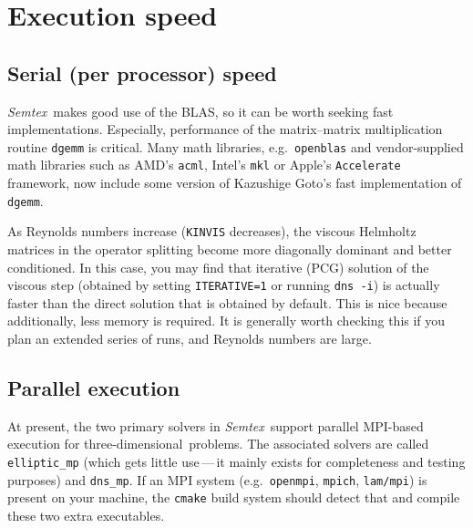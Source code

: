 \documentclass[11pt]{report}
\newcommand{\Semtex}{\emph{Semtex}} \newcommand{\Dog}{\emph{Dog}}
\newcommand\threed{three-di\-men\-sion\-al}
\newcommand{\eg}{e.g.\ } \newcommand{\CC}{\mathrm{c.c.}}
\begin{document}
\section{Execution speed}
\label{sec.speed}

\subsection{Serial (per processor) speed}

\Semtex\ makes good use of the BLAS, so it can be worth seeking fast
implementations. Especially, performance of the matrix--matrix
multiplication routine \verb+dgemm+ is critical. Many math libraries,
\eg \verb|openblas| and vendor-supplied math libraries such as AMD's
\verb|acml|, Intel's \verb|mkl| or Apple's \verb|Accelerate|
framework, now include some version of Kazushige Goto's fast
implementation of \verb|dgemm|.

As Reynolds numbers increase (\ie \verb+KINVIS+ decreases), the
viscous Helmholtz matrices in the operator splitting become more
diagonally dominant and better conditioned. In this case, you may find
that iterative (PCG) solution of the viscous step (obtained by setting
\verb|ITERATIVE=1| or running \verb|dns -i|) is actually faster than
the direct solution that is obtained by default. This is nice because
additionally, less memory is required. It is generally worth checking
this if you plan an extended series of runs, and Reynolds numbers are
large.

\subsection{Parallel execution}
\label{sec.mpi}

At present, the two primary solvers in \Semtex\ support parallel
MPI-based execution for \threed\ problems.  The associated solvers are
called \verb|elliptic_mp| (which gets little use\,---\,it mainly
exists for completeness and testing purposes) and \verb|dns_mp|.  If
an MPI system (\eg \verb|openmpi|, \verb|mpich|, \verb|lam/mpi|) is
present on your machine, the \verb|cmake| build system should detect
that and compile these two extra executables.
\end{document}
